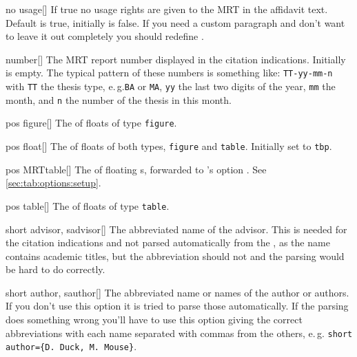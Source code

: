 \begin{describeopt}{no usage}[]
  If true no usage rights are given to the MRT in the affidavit text. Default is
  true, initially is false. If you need a custom paragraph and don't want to
  leave it out completely you should redefine .
\end{describeopt}
\begin{describeopt}{number}[]
  The MRT report number displayed in the citation indications. Initially is
  empty. The typical pattern of these numbers is something like:
  \texttt{TT-yy-mm-n} with \texttt{TT} the thesis type, e.\,g.\@ \texttt{BA} or
  \texttt{MA}, \texttt{yy} the last two digits of the year, \texttt{mm} the
  month, and \texttt{n} the number of the thesis in this month.
\end{describeopt}
\begin{describeopt}{pos figure}[]
  The  of floats of type \texttt{figure}.
\end{describeopt}
\begin{describeopt}{pos float}[]
  The  of floats of both types, \texttt{figure} and
  \texttt{table}. Initially set to \texttt{tbp}.
\end{describeopt}
\begin{describeopt}{pos MRTtable}[]
  The  of floating s, forwarded to 's
  option . See \autoref{sec:tab:options:setup}.
\end{describeopt}
\begin{describeopt}{pos table}[]
  The  of floats of type \texttt{table}.
\end{describeopt}
\begin{describeopt}{short advisor, sadvisor}[]
  The abbreviated name of the advisor. This is needed for the citation
  indications and not parsed automatically from the , as the name
  contains academic titles, but the abbreviation should not and the parsing
  would be hard to do correctly.
\end{describeopt}
\begin{describeopt}{short author, sauthor}[]
  The abbreviated name or names of the author or authors. If you don't use this
  option it is tried to parse those automatically. If the parsing does something
  wrong you'll have to use this option giving the correct abbreviations with
  each name separated with commas from the others, e.\,g.\@ 
  \texttt{short author=\{D. Duck, M. Mouse\}}.
\end{describeopt}
